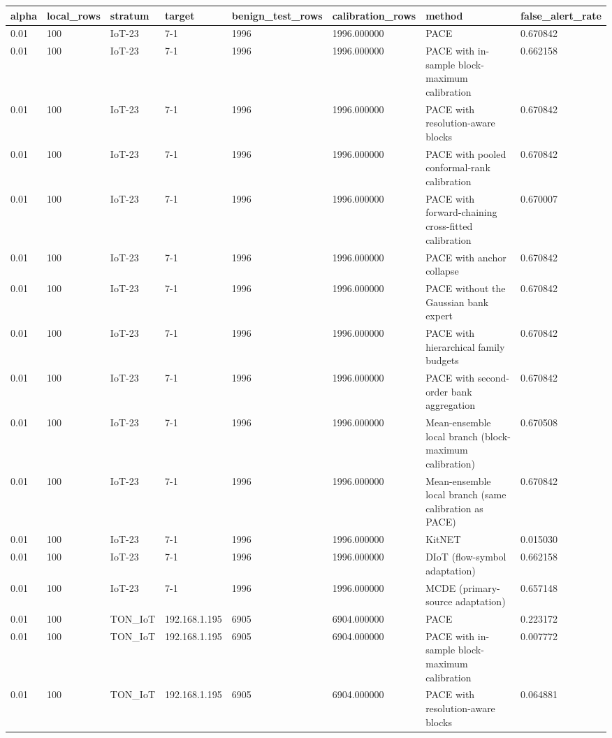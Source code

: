 \begin{tabular}{llllllll}
\toprule
alpha & local\_rows & stratum & target & benign\_test\_rows & calibration\_rows & method & false\_alert\_rate \\
\midrule
0.01 & 100 & IoT-23 & 7-1 & 1996 & 1996.000000 & PACE & 0.670842 \\
0.01 & 100 & IoT-23 & 7-1 & 1996 & 1996.000000 & PACE with in-sample block-maximum calibration & 0.662158 \\
0.01 & 100 & IoT-23 & 7-1 & 1996 & 1996.000000 & PACE with resolution-aware blocks & 0.670842 \\
0.01 & 100 & IoT-23 & 7-1 & 1996 & 1996.000000 & PACE with pooled conformal-rank calibration & 0.670842 \\
0.01 & 100 & IoT-23 & 7-1 & 1996 & 1996.000000 & PACE with forward-chaining cross-fitted calibration & 0.670007 \\
0.01 & 100 & IoT-23 & 7-1 & 1996 & 1996.000000 & PACE with anchor collapse & 0.670842 \\
0.01 & 100 & IoT-23 & 7-1 & 1996 & 1996.000000 & PACE without the Gaussian bank expert & 0.670842 \\
0.01 & 100 & IoT-23 & 7-1 & 1996 & 1996.000000 & PACE with hierarchical family budgets & 0.670842 \\
0.01 & 100 & IoT-23 & 7-1 & 1996 & 1996.000000 & PACE with second-order bank aggregation & 0.670842 \\
0.01 & 100 & IoT-23 & 7-1 & 1996 & 1996.000000 & Mean-ensemble local branch (block-maximum calibration) & 0.670508 \\
0.01 & 100 & IoT-23 & 7-1 & 1996 & 1996.000000 & Mean-ensemble local branch (same calibration as PACE) & 0.670842 \\
0.01 & 100 & IoT-23 & 7-1 & 1996 & 1996.000000 & KitNET & 0.015030 \\
0.01 & 100 & IoT-23 & 7-1 & 1996 & 1996.000000 & DIoT (flow-symbol adaptation) & 0.662158 \\
0.01 & 100 & IoT-23 & 7-1 & 1996 & 1996.000000 & MCDE (primary-source adaptation) & 0.657148 \\
0.01 & 100 & TON\_IoT & 192.168.1.195 & 6905 & 6904.000000 & PACE & 0.223172 \\
0.01 & 100 & TON\_IoT & 192.168.1.195 & 6905 & 6904.000000 & PACE with in-sample block-maximum calibration & 0.007772 \\
0.01 & 100 & TON\_IoT & 192.168.1.195 & 6905 & 6904.000000 & PACE with resolution-aware blocks & 0.064881 \\

\end{tabular}
